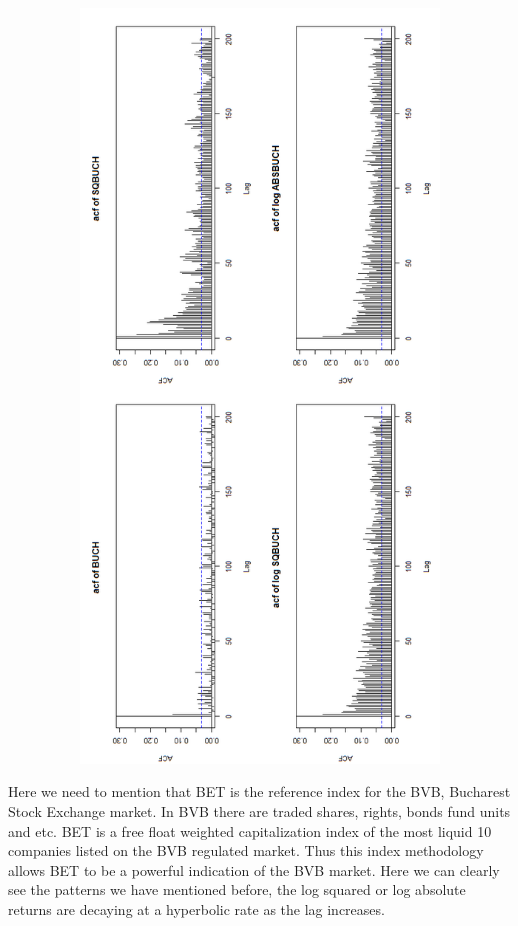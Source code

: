 \documentclass[10pt,a4paper]{article}
\begin{document}
\begin{figure}[!htbp]
\centering
\includegraphics[width = 16.5cm, height=20cm]{Rplot.png}
\caption{}
\end{figure}



Here we need to mention that BET is the reference index for the BVB, Bucharest Stock Exchange market. In BVB  there are traded shares, rights, bonds fund units and etc. BET is a free float weighted capitalization index of the most liquid 10 companies listed on the BVB regulated market. Thus this index methodology allows BET to be a powerful indication of the BVB market. Here we can clearly see the patterns we have mentioned before, the log squared or log absolute returns are decaying at a hyperbolic rate as the lag increases.
\end{document}
